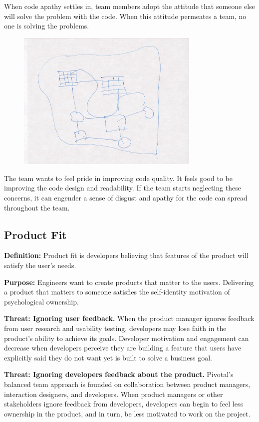 When code apathy settles in, team members adopt the attitude that someone else will solve the problem with the code. When this attitude permeates a team, no one is solving the problems. 

\begin{figure}[t]
\centering
\includegraphics[width=3.45in]{team_code_ownership_images/CodeOwnership.jpg}
\caption{}
\label{Programmer1}
\end{figure}

The team wants to feel pride in improving code quality.  It feels good to be improving the code design and readability. If the team starts neglecting these concerns, it can engender a sense of disgust and apathy for the code can spread throughout the team.

\subsection{Product Fit}
\textbf{Definition:} Product fit is developers believing that features of the product will satisfy the user's needs.

\textbf{Purpose:} Engineers want to create products that matter to the users. Delivering a product that matters to someone satisfies the self-identity motivation of psychological ownership.

\textbf{Threat: Ignoring user feedback.} When the product manager ignores feedback from user research and usability testing, developers may lose faith in the product's ability to achieve its goals. Developer motivation and engagement can decrease when developers perceive they are building a feature that users have explicitly said they do not want yet is built to solve a business goal. 

\textbf{Threat: Ignoring developers feedback about the product.} Pivotal's balanced team approach is founded on collaboration between product managers, interaction designers, and developers. When product managers or other stakeholders ignore feedback from developers, developers can begin to feel less ownership in the product, and in turn, be less motivated to work on the project. 

